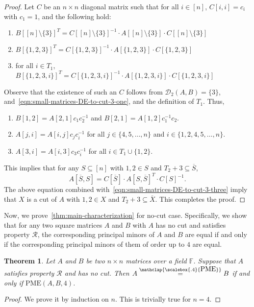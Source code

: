 \documentclass[11pt,letterpaper]{article}
\newcommand{\comp}[1]{\overline{#1}}
\newcommand{\F}{\mathbb{F}}
\newtheorem{theorem}{Theorem}[section]
\newcommand{\PME}{\stackrel{\mathclap{\scalebox{.4}{\mbox{PME}}}}{=}}
\newcommand{\kPME}[3]{\mathrm{PME}(#1, #2, #3)}
\newcommand{\nsubset}[1]{[n]\setminus\{#1\}}
\newcommand{\calD}{\mathcal{D}}
\newcommand{\prop}{\mathcal{R}}
\begin{document}
{{{\begin{proof}
Let $C$ be an $n\times n$ diagonal matrix  such that for all $i\in[n]$, $C[i,i]=c_i$ with $c_1=1$, and the following hold:  
\begin{enumerate}
\item  $B[\nsubset{3}]^T=C[\nsubset{3}]^{-1}\cdot A[\nsubset{3}]\cdot C[\nsubset{3}]$
\item $B[\{1,2,3\}]^T=C[\{1,2,3\}]^{-1}\cdot A[\{1,2,3\}]\cdot C[\{1,2,3\}]$
\item for all $i\in T_1$, $B[\{1,2,3,i\}]^T=C[\{1,2,3,i\}]^{-1}\cdot A[\{1,2,3,i\}]\cdot C[\{1,2,3,i\}]$
\end{enumerate}
Observe that the existence of such an $C$ follows from $\calD_2(A,B)=\{3\}$, and~\cref{eqn:small-matrices-DE-to-cut-3-one}, and the definition of $T_1$. Thus, 
\begin{enumerate}
\item $B[1,2]=A[2,1]c_1c_2^{-1}$ and $B[2,1]=A[1,2]c_1^{-1}c_2$.
\item $A[j,i]=A[i,j]c_jc_i^{-1}$ for all $j\in\{4,5,\ldots, n\}$ and $i\in\{1,2,4,5,\ldots, n\}$.
\item $A[3,i]=A[i,3]c_3c_i^{-1}$ for all $i\in T_1\cup\{1,2\}$.
\end{enumerate}
This implies that for any $S\subseteq [n]$ with $1,2\in S$ and $T_2+3\subseteq \comp{S}$, $$A[\comp{S}, S]= C[\comp{S}]\cdot A[S, \comp{S}]^T\cdot C[S]^{-1}.$$
The above equation combined with~\cref{eqn:small-matrices-DE-to-cut-3-three} imply that $X$ is a cut of $A$ with $1,2\in X$ and $T_2+3\subseteq \comp{X}$. This completes the proof. 
 \end{proof}



Now, we prove~\cref{thm:main-characterization} for no-cut case. Specifically, we show that for any two square matrices $A$ and $B$ with $A$ has no cut  and satisfies property $\prop$, the corresponding principal minors of $A$ and $B$ are equal if and only if the corresponding principal minors of them of order up to $4$ are equal.

\begin{theorem}
\label{thm:PME-for-no-cut}
Let $A$ and $B$ be two $n\times n$ matrices over a field $\F$. Suppose that $A$ satisfies property $\prop$ and has no cut. Then $A\PME B$ if and only if $\kPME{A}{B}{4}$.
\end{theorem}
\begin{proof}
We prove it by induction on $n$. 
%
This is trivially true for $n = 4$. 
%


\end{proof}}}}
\end{document}
